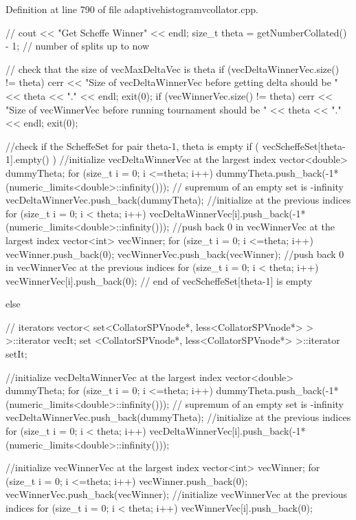 \-Definition at line 790 of file adaptivehistogramvcollator.\-cpp.


\begin{DoxyCode}
{ 
  //  cout << "Get Scheffe Winner" << endl;
    size_t theta = getNumberCollated() - 1;  // number of splits up to now

    // check that the size of vecMaxDeltaVec is theta   
    if (vecDeltaWinnerVec.size() != theta) {
      cerr << "Size of vecDeltaWinnerVec before getting delta should be " 
           << theta << "." << endl;
      exit(0);
    }
    if (vecWinnerVec.size() != theta) {
      cerr << "Size of vecWinnerVec before running tournament should be "
           << theta << "." << endl;
      exit(0);
    } 
  
   //check if the ScheffeSet for pair {theta-1, theta} is empty
  if ( vecScheffeSet[theta-1].empty() ) {
    //initialize vecDeltaWinnerVec at the largest index
    vector<double> dummyTheta;
    for (size_t i = 0; i <=theta; i++) {
      dummyTheta.push_back(-1*(numeric_limits<double>::infinity())); 
      // supremum of an empty set is -infinity
    }
    vecDeltaWinnerVec.push_back(dummyTheta);
    //initialize at the previous indices
    for (size_t i = 0; i < theta; i++){
      vecDeltaWinnerVec[i].push_back(-1*(numeric_limits<double>::infinity()));
    }   
    //push back 0 in vecWinnerVec at the largest index
    vector<int> vecWinner;
    for (size_t i = 0; i <=theta; i++) {
      vecWinner.push_back(0); 
    }
    vecWinnerVec.push_back(vecWinner);
    //push back 0 in vecWinnerVec at the previous indices
    for (size_t i = 0; i < theta; i++){
      vecWinnerVec[i].push_back(0);
    }
  } // end of vecScheffeSet[theta-1] is empty 
  
  else {
    // iterators
    vector< set<CollatorSPVnode*, less<CollatorSPVnode*> > >::iterator vecIt;
    set <CollatorSPVnode*, less<CollatorSPVnode*> >::iterator setIt; 

    //initialize vecDeltaWinnerVec at the largest index
    vector<double> dummyTheta;
    for (size_t i = 0; i <=theta; i++) {
      dummyTheta.push_back(-1*(numeric_limits<double>::infinity())); 
      // supremum of an empty set is -infinity
    }
    vecDeltaWinnerVec.push_back(dummyTheta);
    //initialize at the previous indices
    for (size_t i = 0; i < theta; i++){
      vecDeltaWinnerVec[i].push_back(-1*(numeric_limits<double>::infinity()));
    }
    
    //initialize vecWinnerVec at the largest index
    vector<int> vecWinner;
    for (size_t i = 0; i <=theta; i++) {
      vecWinner.push_back(0); 
    }
    vecWinnerVec.push_back(vecWinner);    
    //initialize vecWinnerVec at the previous indices
    for (size_t i = 0; i < theta; i++){
      vecWinnerVec[i].push_back(0);
    }
        
}}
\end{DoxyCode}
